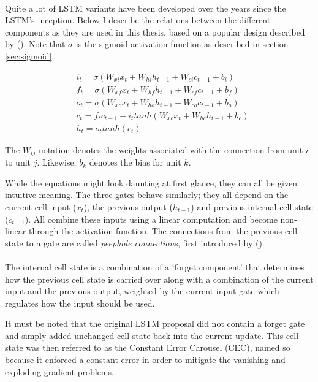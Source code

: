 \paragraph{}
Quite a lot of LSTM variants have been developed over the years
since the LSTM's inception.
Below I describe the relations between the different components
as they are used in this thesis,
based on a popular design described by
\citeauthor{Graves2013} (\citeyear{Graves2013}).
Note that $\sigma$ is the sigmoid activation function
as described in section \ref{sec:sigmoid}.

\begin{align}
  &i_t = \sigma(W_{xi}x_t + W_{hi}h_{t-1}+W_{ci}c_{t-1} + b_i) \\
  &f_t = \sigma(W_{xf}x_t + W_{hf}h_{t-1}+W_{cf}c_{t-1} + b_f) \\
  &o_t = \sigma(W_{xo}x_t + W_{ho}h_{t-1}+W_{co}c_{t-1} + b_o) \\
  &c_t = f_tc_{t-1}+i_t tanh(W_{xc}x_t+W_{hc}h_{t-1}+b_c) \\
  &h_t = o_t tanh(c_t)
\end{align}

The $W_{ij}$ notation denotes the weights associated
with the connection from unit $i$ to unit $j$.
Likewise, $b_k$ denotes the bias for unit $k$.

While the equations might look daunting at first glance,
they can all be given intuitive meaning.
The three gates behave similarly;
they all depend on the current cell input ($x_t$),
the previous output ($h_{t-1}$)
and previous internal cell state ($c_{t-1}$).
All combine these inputs using a linear computation
and become non-linear through the activation function.
The connections from the previous cell state
to a gate are called \textit{peephole connections},
first introduced by
\citeauthor{gers2000recurrent} (\citeyear{gers2000recurrent}).

\paragraph{}
The internal cell state is a combination
of a `forget component' that determines
how the previous cell state is carried over
along with a combination of the current input and the previous output,
weighted by the current input gate
which regulates how the input should be used.

It must be noted that the original LSTM proposal
did not contain a forget gate
and simply added unchanged cell state
back into the current update.
This cell state was then referred to as the Constant Error Carousel (CEC),
named so because it enforced a constant error
in order to mitigate the vanishing and exploding gradient problems.


